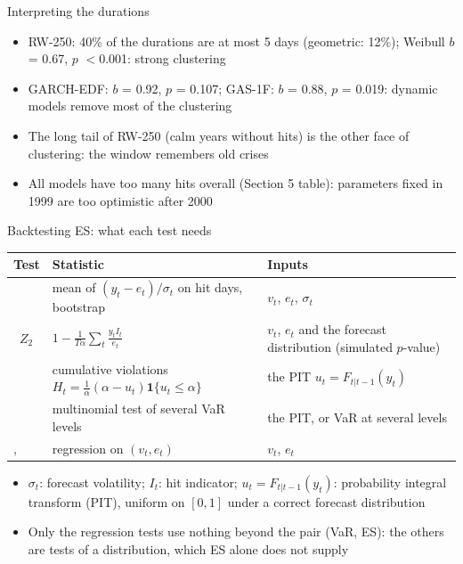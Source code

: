 \begin{frame}{Interpreting the durations}
\itemsize{\small}
\begin{itemize}
    \item RW-250: 40\% of the durations are at most 5 days (geometric: 12\%); Weibull $b$ = 0.67, $p$ $<$0.001: strong clustering
    \item GARCH-EDF: $b$ = 0.92, $p$ = 0.107; GAS-1F: $b$ = 0.88, $p$ = 0.019: dynamic models remove most of the clustering
    \item The long tail of RW-250 (calm years without hits) is the other face of clustering: the window remembers old crises
    \item All models have too many hits overall (Section 5 table): parameters fixed in 1999 are too optimistic after 2000
\end{itemize}
\end{frame}

\begin{frame}{Backtesting ES: what each test needs}
\itemsize{\footnotesize}
\begin{center}
\scriptsize
\begin{tabular}{>{\raggedright\arraybackslash}p{3.2cm}>{\raggedright\arraybackslash}p{4.5cm}>{\raggedright\arraybackslash}p{3.8cm}}
\toprule
\textbf{Test} & \textbf{Statistic} & \textbf{Inputs} \\
\midrule
{}{} & mean of $(y_t - e_t)/\sigma_t$ on hit days, bootstrap & $v_t$, $e_t$, $\sigma_t$ \\
\ $Z_2$ & $1 - \frac{1}{T\alpha}\sum_t \frac{y_tI_t}{e_t}$ & $v_t$, $e_t$ and the forecast distribution (simulated $p$-value) \\
{} & cumulative violations $H_t = \frac{1}{\alpha}(\alpha - u_t)\mathbf 1\{u_t \le \alpha\}$ & the PIT $u_t = F_{t|t-1}(y_t)$ \\
{} & multinomial test of several VaR levels & the PIT, or VaR at several levels \\
, {} & regression on $(v_t, e_t)$ & $v_t$, $e_t$ \\
\bottomrule
\end{tabular}
\end{center}
\begin{itemize}
    \item $\sigma_t$: forecast volatility; $I_t$: hit indicator; $u_t = F_{t|t-1}(y_t)$: probability integral transform (PIT), uniform on $[0, 1]$ under a correct forecast distribution
    \item Only the regression tests use nothing beyond the pair (VaR, ES): the others are tests of a distribution, which ES alone does not supply
\end{itemize}
\end{frame}

